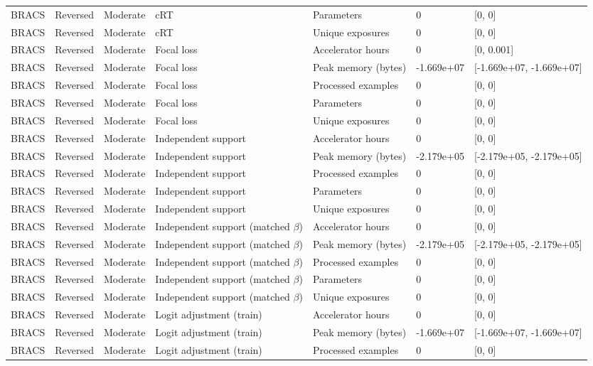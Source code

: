 \begin{longtable}{lllllll}
BRACS & Reversed & Moderate & cRT & Parameters & 0 & [0, 0] \\
BRACS & Reversed & Moderate & cRT & Unique exposures & 0 & [0, 0] \\
BRACS & Reversed & Moderate & Focal loss & Accelerator hours & 0 & [0, 0.001] \\
BRACS & Reversed & Moderate & Focal loss & Peak memory (bytes) & -1.669e+07 & [-1.669e+07, -1.669e+07] \\
BRACS & Reversed & Moderate & Focal loss & Processed examples & 0 & [0, 0] \\
BRACS & Reversed & Moderate & Focal loss & Parameters & 0 & [0, 0] \\
BRACS & Reversed & Moderate & Focal loss & Unique exposures & 0 & [0, 0] \\
BRACS & Reversed & Moderate & Independent support & Accelerator hours & 0 & [0, 0] \\
BRACS & Reversed & Moderate & Independent support & Peak memory (bytes) & -2.179e+05 & [-2.179e+05, -2.179e+05] \\
BRACS & Reversed & Moderate & Independent support & Processed examples & 0 & [0, 0] \\
BRACS & Reversed & Moderate & Independent support & Parameters & 0 & [0, 0] \\
BRACS & Reversed & Moderate & Independent support & Unique exposures & 0 & [0, 0] \\
BRACS & Reversed & Moderate & Independent support (matched $\beta$) & Accelerator hours & 0 & [0, 0] \\
BRACS & Reversed & Moderate & Independent support (matched $\beta$) & Peak memory (bytes) & -2.179e+05 & [-2.179e+05, -2.179e+05] \\
BRACS & Reversed & Moderate & Independent support (matched $\beta$) & Processed examples & 0 & [0, 0] \\
BRACS & Reversed & Moderate & Independent support (matched $\beta$) & Parameters & 0 & [0, 0] \\
BRACS & Reversed & Moderate & Independent support (matched $\beta$) & Unique exposures & 0 & [0, 0] \\
BRACS & Reversed & Moderate & Logit adjustment (train) & Accelerator hours & 0 & [0, 0] \\
BRACS & Reversed & Moderate & Logit adjustment (train) & Peak memory (bytes) & -1.669e+07 & [-1.669e+07, -1.669e+07] \\
BRACS & Reversed & Moderate & Logit adjustment (train) & Processed examples & 0 & [0, 0] \\

\end{longtable}
